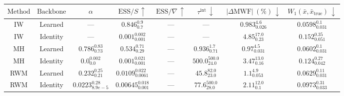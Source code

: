 \begin{tabular}{cccccccc}
  \toprule
  \textbf{$\mathrm{Method}$} & \textbf{$\mathrm{Backbone}$} & \textbf{$\alpha$}        & \textbf{$\mathrm{ESS}/S\,\uparrow$} & \textbf{$\mathrm{ESS}/\nabla\,\uparrow$} & \textbf{$\tau^{\mathrm{int}}\,\downarrow$} & \textbf{$|\Delta\mathrm{MWF}|\ (\%)\,\downarrow$} & \textbf{$W_1(\bar{x}, \bar{x}_{\mathrm{true}})\,\downarrow$} \\
  \midrule
  IW                         & Learned                      & —                        & $\mathbf{0.846^{0.9}_{0.7}}$        & —                                        & —                                          & $0.983^{4.6}_{0.026}$                             & $\mathbf{0.0598^{0.1}_{0.031}}$                              \\
  IW                         & Identity                     & —                        & $0.001^{0.002}_{0.001}$             & —                                        & —                                          & $4.85^{17.0}_{0.23}$                              & $0.152^{0.35}_{0.051}$                                       \\
  MH                         & Learned                      & $0.786^{0.83}_{0.73}$    & $0.534^{0.71}_{0.29}$               & —                                        & $\mathbf{0.936^{1.7}_{0.71}}$              & $\mathbf{0.97^{4.5}_{0.031}}$                     & $0.0602^{0.1}_{0.031}$                                       \\
  MH                         & Identity                     & $0.0^{0.002}_{0.0}$      & $0.001^{0.021}_{0.001}$             & —                                        & $500.0^{500.0}_{24.0}$                     & $3.47^{13.0}_{0.16}$                              & $0.124^{0.27}_{0.042}$                                       \\
  RWM                        & Learned                      & $0.232^{0.25}_{0.21}$    & $0.0109^{0.022}_{0.0061}$           & —                                        & $45.8^{82.0}_{23.0}$                       & $1.1^{4.9}_{0.053}$                               & $0.0629^{0.11}_{0.031}$                                      \\
  RWM                        & Identity                     & $0.0223^{0.28}_{8.9e-5}$ & $0.00645^{0.018}_{0.001}$           & —                                        & $77.6^{500.0}_{28.0}$                      & $2.11^{12.0}_{0.1}$                               & $0.0973^{0.31}_{0.033}$                                      \\

\end{tabular}
